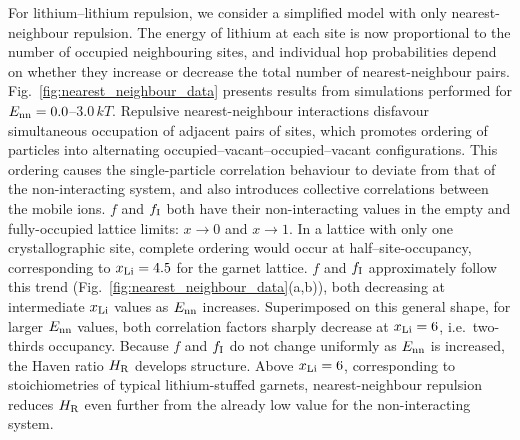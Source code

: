 \documentclass[aps,prb,twocolumn,superscriptaddress,reprint]{revtex4-1}
\newcommand{\xLi}{x_\m{Li}}
\begin{document}
For lithium--lithium repulsion, we consider a simplified model with only nearest-neighbour repulsion. 
The energy of lithium at each site is now proportional to the number of occupied neighbouring sites, and individual hop probabilities depend on whether they increase or decrease the total number of nearest-neighbour pairs. 
Fig.~\ref{fig:nearest_neighbour_data} presents results from simulations performed for $E_{\mathrm{nn}}=0.0$--$3.0\,kT$. 
Repulsive nearest-neighbour interactions disfavour simultaneous occupation of adjacent pairs of sites, which promotes ordering of particles into alternating  occupied--vacant--occupied--vacant configurations.
This ordering causes the single-particle correlation behaviour to deviate from that of the non-interacting system, and also introduces collective correlations between the mobile ions.\cite{Murch_SolStatIonics1982} $f$ and $f_{\mathrm{I}}$ both have their non-interacting values in the empty and fully-occupied lattice limits: $x\to0$ and $x\to1$. In a lattice with only one crystallographic site, complete ordering would occur at half--site-occupancy, corresponding to $\xLi=4.5$ for the garnet lattice. $f$ and $f_{\mathrm{I}}$ approximately follow this trend (Fig.~\ref{fig:nearest_neighbour_data}(a,b)), both decreasing at intermediate $\xLi$ values as $E_{\mathrm{nn}}$ increases. Superimposed on this general shape, for larger $E_{\mathrm{nn}}$ values, both correlation factors sharply decrease at $\xLi=6$, i.e.\ two-thirds occupancy. Because $f$ and $f_{\mathrm{I}}$ do not change uniformly as $E_{\mathrm{nn}}$ is increased, the Haven ratio $H_{\mathrm{R}}$ develops structure. Above $\xLi=6$, corresponding to stoichiometries of typical lithium-stuffed garnets, nearest-neighbour repulsion reduces $H_{\mathrm{R}}$ even further from the already low value for the non-interacting system.
\end{document}
